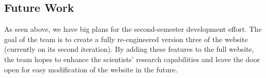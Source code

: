 \documentclass[12pt]{article}
\begin{document}
\begin{spacing}{1.5}
\subsection{Future Work}
As seen above, we have big plans for the second-semester development effort. The goal of the team is to create a fully re-engineered version three of the website (currently on its second iteration). By adding these features to the full website, the team hopes to enhance the scientists' research capabilities and leave the door open for easy modification of the website in the future.

\end{spacing}
\end{document}
